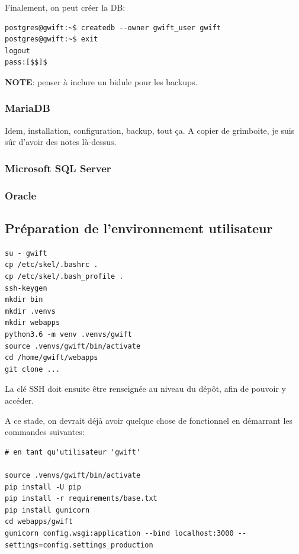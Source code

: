 \documentclass[11pt]{amsbook}
\newcommand{\admonition}[2]{\textbf{#1}: {#2}}
\begin{document}
Finalement, on peut créer la DB:


\begin{verbatim}
postgres@gwift:~$ createdb --owner gwift_user gwift
postgres@gwift:~$ exit
logout
pass:[$$]$
\end{verbatim}

\admonition{NOTE}{penser à inclure un bidule pour les backups.}
\hypertarget{x-mariadb}{\subsubsection{MariaDB}}
Idem, installation, configuration, backup, tout ça.
A copier de grimboite, je suis sûr d’avoir des notes là-dessus.


\hypertarget{x-microsoft-sql-server}{\subsubsection{Microsoft SQL Server}}

\hypertarget{x-oracle}{\subsubsection{Oracle}}

\hypertarget{x-préparation-de-l’environnement-utilisateur}{\subsection{Préparation de l’environnement utilisateur}}
\begin{verbatim}
su - gwift
cp /etc/skel/.bashrc .
cp /etc/skel/.bash_profile .
ssh-keygen
mkdir bin
mkdir .venvs
mkdir webapps
python3.6 -m venv .venvs/gwift
source .venvs/gwift/bin/activate
cd /home/gwift/webapps
git clone ...
\end{verbatim}

La clé SSH doit ensuite être renseignée au niveau du dépôt, afin de pouvoir y accéder.


A ce stade, on devrait déjà avoir quelque chose de fonctionnel en démarrant les commandes suivantes:


\begin{verbatim}
# en tant qu'utilisateur 'gwift'

source .venvs/gwift/bin/activate
pip install -U pip
pip install -r requirements/base.txt
pip install gunicorn
cd webapps/gwift
gunicorn config.wsgi:application --bind localhost:3000 --settings=config.settings_production
\end{verbatim}
\end{document}
